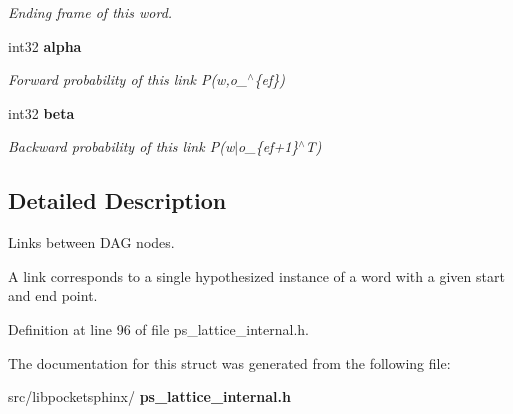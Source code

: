 \begin{DoxyCompactItemize}
\begin{DoxyCompactList}\small\item\em Ending frame of this word. \end{DoxyCompactList}\item 
\mbox{\label{structps__latlink__s_ad2f031d271f1d875223aae33116d3f40}} 
int32 \textbf{ alpha}
\begin{DoxyCompactList}\small\item\em Forward probability of this link P(w,o\+\_$^\wedge$\{ef\}) \end{DoxyCompactList}\item 
\mbox{\label{structps__latlink__s_a4c27cd5d4f514832d3d46993e2ee87df}} 
int32 \textbf{ beta}
\begin{DoxyCompactList}\small\item\em Backward probability of this link P(w$\vert$o\+\_\+\{ef+1\}$^\wedge$T) \end{DoxyCompactList}\end{DoxyCompactItemize}


\subsection{Detailed Description}
Links between D\+AG nodes. 

A link corresponds to a single hypothesized instance of a word with a given start and end point. 

Definition at line 96 of file ps\+\_\+lattice\+\_\+internal.\+h.



The documentation for this struct was generated from the following file\+:\begin{DoxyCompactItemize}
\item 
src/libpocketsphinx/\textbf{ ps\+\_\+lattice\+\_\+internal.\+h}\end{DoxyCompactItemize}
